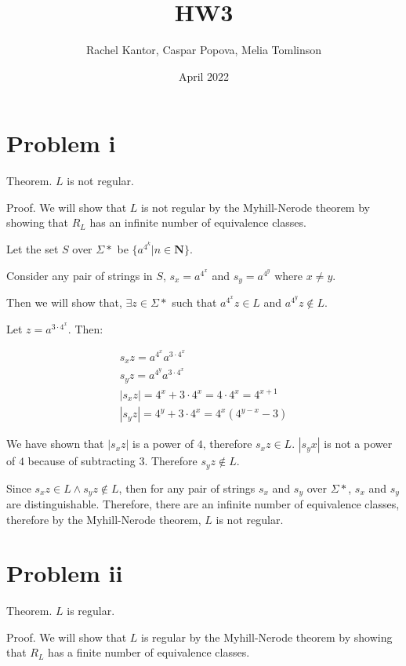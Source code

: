 \documentclass{article}
\title{HW3}
\author{Rachel Kantor, Caspar Popova, Melia Tomlinson}
\date{April 2022}
\begin{document}
\maketitle

\section{Problem i}

Theorem. $L$ is not regular.

\noindent Proof. We will show that $L$ is not regular by the Myhill-Nerode theorem by showing that $R_L$ has an infinite number of equivalence classes.

\noindent Let the set $S$ over $\Sigma *$ be $\{a^{4^k} | n \in \mathbf{N}\}$.

\noindent Consider any pair of strings in $S$, $s_x = a^{4^x}$ and $s_y = a^{4^y}$ where $x \neq y$.

\noindent Then we will show that, $\exists z \in \Sigma *$ such that $a^{4^x} z \in L$ and $a^{4^y} z \notin L$.

\noindent Let $z=a^{3 \cdot 4^x}$. Then:

\begin{align*}
    s_x z = a^{4^x} a^{3 \cdot 4^x} \\
    s_y z = a^{4^y} a^{3 \cdot 4^x} \\
    |s_x z| = 4^x + 3 \cdot 4^x = 4 \cdot 4^x  = 4^{x+1} \\
    |s_y z| = 4^y + 3 \cdot 4^x = 4^x ( 4^{y-x} - 3)
\end{align*}

\noindent We have shown that $|s_x z|$ is a power of $4$, therefore $s_x z \in L$. $|s_y x|$ is not a power of $4$ because of subtracting $3$. Therefore $s_y z \notin L$.

\noindent Since $s_x z \in L \wedge s_y z \notin L$, then for any pair of strings $s_x$ and $s_y$ over $\Sigma *$, $s_x$ and $s_y$ are distinguishable. Therefore, there are an infinite number of equivalence classes, therefore by the Myhill-Nerode theorem, $L$ is not regular.

\section{Problem ii}

Theorem. $L$ is regular.

\noindent Proof. We will show that $L$ is regular by the Myhill-Nerode theorem by showing that $R_L$ has a finite number of equivalence classes. 
\end{document}
